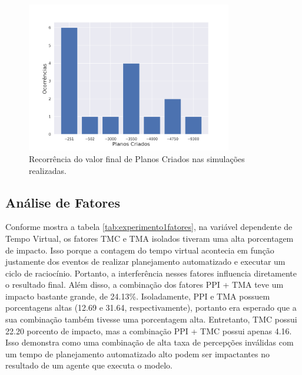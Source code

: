 \begin{figure}[h!]
    \centering
    \includegraphics[width=0.8\textwidth]{Images/plans_created_occurrences.png}
    \caption{Recorrência do valor final de Planos Criados nas simulações realizadas.}
    \label{fig:pc_occurrences}
\end{figure}

\subsection{Análise de Fatores}

Conforme mostra a tabela \ref{tab:experimento1fatores}, na variável dependente de Tempo Virtual, os fatores TMC e TMA isolados tiveram uma alta porcentagem de impacto. Isso porque a contagem do tempo virtual acontecia em função justamente dos eventos de realizar planejamento automatizado e executar um ciclo de raciocínio. Portanto, a interferência nesses fatores influencia diretamente o resultado final. Além disso, a combinação dos fatores PPI + TMA teve um impacto bastante grande, de 24.13\%. Isoladamente, PPI e TMA possuem porcentagens altas (12.69 e 31.64, respectivamente), portanto era esperado que a sua
combinação também tivesse uma porcentagem alta. Entretanto, TMC possui 22.20 porcento de impacto, mas a combinação PPI + TMC possui apenas 4.16. Isso demonstra como uma combinação de alta taxa de percepções inválidas com um tempo de planejamento automatizado alto podem ser impactantes no resultado de um agente que executa o modelo.

